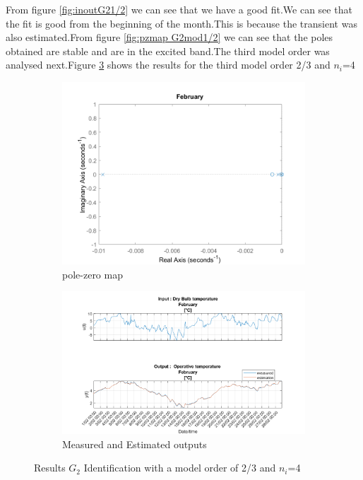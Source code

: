 \documentclass[a4paper,12pt]{article}
\numberwithin{equation}{section}
\begin{document}
\noindent
From figure \ref{fig:inoutG21/2} we can see that we have a good fit.We can see that the fit is good from the beginning of the month.This is because the transient was also estimated.From figure \ref{fig:pzmap G2mod1/2} we can see that the poles obtained are stable and are in the excited band.The third model order was analysed next.Figure \ref{fig:G2mod2/3} shows the results for the third model order 2/3 and $n_{i}$=4

\begin{figure}[H]
\centering
\begin{subfigure}{.5\textwidth}
  \centering
  \includegraphics[width=.7\linewidth]{G2mod23pzmap.png}
  \caption{pole-zero map}
  \label{fig:pzmap G2mod2/3}
\end{subfigure}

\begin{subfigure}{\textwidth}
  \centering
  \includegraphics[scale=0.38]{G2mod23InOut.png}
  \caption{Measured and Estimated outputs}
  \label{fig:inoutG22/3}
\end{subfigure}
\caption{Results $G_{2}$ Identification with a model order of 2/3 and $n_{i}$=4 }
\label{fig:G2mod2/3}
\end{figure}
\end{document}
